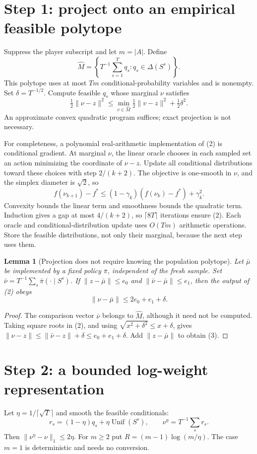 \documentclass[11pt,a4paper]{article}
\newtheorem{lemma}[theorem]{Lemma}
\begin{document}
\section{Step 1: project onto an empirical feasible polytope}
Suppress the player subscript and let $m=|A|$. Define
\[
 \widehat M=\left\{T^{-1}\sum_{s=1}^Tq_s:
       q_s\in\Delta(S^s)\right\}.
\]
This polytope uses at most $Tm$ conditional-probability variables and is nonempty. Set $\delta=T^{-1/2}$. Compute feasible $q_s$ whose marginal $\nu$ satisfies
\[
 \tfrac12\|\nu-z\|^2
 \le \min_{v\in\widehat M}\tfrac12\|v-z\|^2+\tfrac12\delta^2. \tag{2}
\]
An approximate convex quadratic program suffices; exact projection is not necessary.

For completeness, a polynomial real-arithmetic implementation of (2) is conditional gradient. At marginal $\nu$, the linear oracle chooses in each sampled set an action minimizing the coordinate of $\nu-z$. Update all conditional distributions toward these choices with step $2/(k+2)$. The objective is one-smooth in $\nu$, and the simplex diameter is $\sqrt2$, so
\[
 f(\nu_{k+1})-f^*\le(1-\gamma_k)(f(\nu_k)-f^*)+\gamma_k^2.
\]
Convexity bounds the linear term and smoothness bounds the quadratic term. Induction gives a gap at most $4/(k+2)$, so $\lceil8T\rceil$ iterations ensure (2). Each oracle and conditional-distribution update uses $O(Tm)$ arithmetic operations. Store the feasible distributions, not only their marginal, because the next step uses them.

\begin{lemma}[Projection does not require knowing the population polytope]
Let $\bar\mu$ be implemented by a fixed policy $\bar\pi$, independent of the fresh sample. Set $\bar\nu=T^{-1}\sum_s\bar\pi(\cdot\mid S^s)$. If $\|z-\bar\mu\|\le e_0$ and $\|\bar\nu-\bar\mu\|\le e_1$, then the output of (2) obeys
\[
 \|\nu-\bar\mu\|\le2e_0+e_1+\delta. \tag{3}
\]
\end{lemma}
\begin{proof}
The comparison vector $\bar\nu$ belongs to $\widehat M$, although it need not be computed. Taking square roots in (2), and using $\sqrt{x^2+\delta^2}\le x+\delta$, gives $\|\nu-z\|\le\|\bar\nu-z\|+\delta\le e_0+e_1+\delta$. Add $\|z-\bar\mu\|$ to obtain (3).
\end{proof}

\section{Step 2: a bounded log-weight representation}
Let $\eta=1/\lceil\sqrt T\rceil$ and smooth the feasible conditionals:
\[
 r_s=(1-\eta)q_s+\eta\operatorname{Unif}(S^s),\qquad
 \nu^\eta=T^{-1}\sum_sr_s.
\]
Then $\|\nu^\eta-\nu\|_1\le2\eta$. For $m\ge2$ put
$R=(m-1)\log(m/\eta)$. The case $m=1$ is deterministic and needs no conversion.
\end{document}
